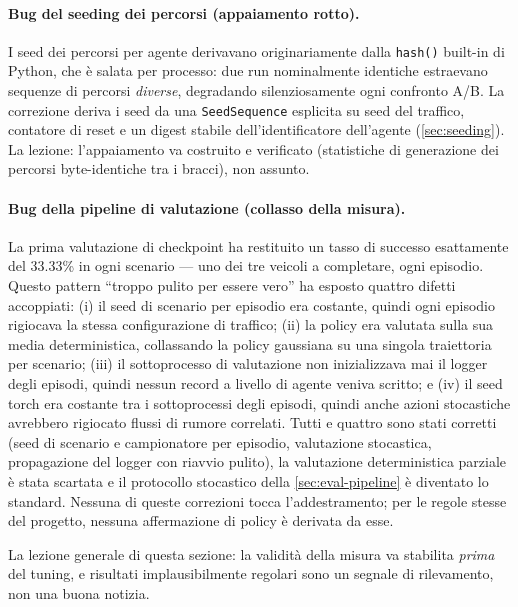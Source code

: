 \paragraph{Bug del seeding dei percorsi (appaiamento rotto).}
I seed dei percorsi per agente derivavano originariamente dalla
\texttt{hash()} built-in di Python, che è salata per processo: due run
nominalmente identiche estraevano sequenze di percorsi \emph{diverse},
degradando silenziosamente ogni confronto A/B. La correzione deriva i
seed da una \texttt{SeedSequence} esplicita su seed del traffico,
contatore di reset e un digest stabile dell'identificatore dell'agente
(\cref{sec:seeding}). La lezione: l'appaiamento va costruito e
verificato (statistiche di generazione dei percorsi byte-identiche tra i
bracci), non assunto.

\paragraph{Bug della pipeline di valutazione (collasso della misura).}
La prima valutazione di checkpoint ha restituito un tasso di successo
esattamente del 33.33\% in ogni scenario --- uno dei tre veicoli a
completare, ogni episodio. Questo pattern ``troppo pulito per essere
vero'' ha esposto quattro difetti accoppiati: (i) il seed di scenario
per episodio era costante, quindi ogni episodio rigiocava la stessa
configurazione di traffico; (ii) la policy era valutata sulla sua media
deterministica, collassando la policy gaussiana su una singola
traiettoria per scenario; (iii) il sottoprocesso di valutazione non
inizializzava mai il logger degli episodi, quindi nessun record a
livello di agente veniva scritto; e (iv) il seed torch era costante tra
i sottoprocessi degli episodi, quindi anche azioni stocastiche avrebbero
rigiocato flussi di rumore correlati. Tutti e quattro sono stati
corretti (seed di scenario e campionatore per episodio, valutazione
stocastica, propagazione del logger con riavvio pulito), la valutazione
deterministica parziale è stata scartata e il protocollo stocastico
della \cref{sec:eval-pipeline} è diventato lo standard. Nessuna di
queste correzioni tocca l'addestramento; per le regole stesse del
progetto, nessuna affermazione di policy è derivata da esse.

La lezione generale di questa sezione: la validità della misura va
stabilita \emph{prima} del tuning, e risultati implausibilmente regolari
sono un segnale di rilevamento, non una buona notizia.

